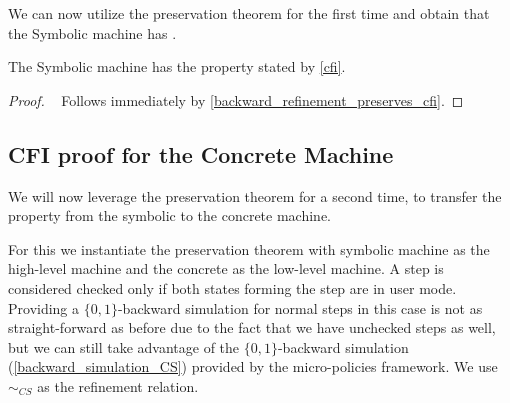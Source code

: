 We can now utilize the preservation theorem for the first time and
obtain that the Symbolic machine has \CFI.

\begin{theorem}\label{CFIsymbolic}
The Symbolic machine has the \CFI property stated by \cref{cfi}.
\end{theorem}
\begin{proof}
  ~ Follows immediately by \cref{backward_refinement_preserves_cfi}.
\end{proof}


\subsection{CFI proof for the Concrete Machine}
\label{sec:concrete_proof}

We will now leverage the preservation theorem for a second time,
to transfer the \CFI property from the symbolic to the concrete
machine.

For this we instantiate the preservation theorem with symbolic machine
as the high-level machine and the concrete as the low-level machine. A
step is considered checked only if both states forming the step are in
user mode. Providing a $\lbrace 0,1 \rbrace$-backward simulation for
normal steps in this case is not as straight-forward as before due to
the fact that we have unchecked steps as well, but we can still take
advantage of the $\lbrace 0,1 \rbrace$-backward simulation
(\cref{backward_simulation_CS}) provided by the micro-policies
framework. We use $\sim_{CS}$ as the refinement relation.

